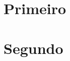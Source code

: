 \documentclass[a4paper]{book}
\begin{document}
\chapter{Primeiro}
 
\kant[1-20]

\chapter{Segundo}
 
\kant[1-20]
\end{document}
